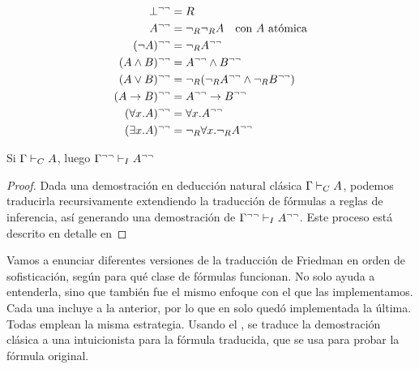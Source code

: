 \begin{definition}
    \begin{align*}
        \bot^{\neg\neg}                         & = R                                                             \\
        A^{\neg\neg}                        & = \neg_R\neg_R A
        \quad \text{con $A$ atómica}                                                                              \\
        (\neg A)^{\neg\neg}                & = \neg_R A^{\neg\neg}                                          \\
        (A \wedge B)^{\neg\neg}       & = A^{\neg\neg} \wedge B^{\neg\neg}                     \\
        (A \vee B)^{\neg\neg}        & = \neg_R(\neg_RA^{\neg\neg} \wedge \neg_RB^{\neg\neg}) \\
        (A \rightarrow B)^{\neg\neg} & = A^{\neg\neg} \rightarrow B^{\neg\neg}               \\
        (\forall x . A)^{\neg\neg}          & = \forall x . A^{\neg\neg}                                    \\
        (\exists x . A)^{\neg\neg}          & = \neg_R \forall x . \neg_R A^{\neg\neg}
    \end{align*}
\end{definition}

\begin{theorem}
    \label{fri:thm:dneg-trans-classic-int}
    Si $\Gamma \vdash_C A$, luego $\Gamma^{\neg\neg} \vdash_I A^{\neg\neg}$
\end{theorem}
\begin{proof}
    Dada una demostración en deducción natural clásica $\Gamma \vdash_C A$, podemos traducirla recursivamente extendiendo la traducción de fórmulas a reglas de inferencia, así generando una demostración de $\Gamma^{\neg\neg} \vdash_I A^{\neg\neg}$.
    Este proceso está descrito en detalle en 
\end{proof}

Vamos a enunciar diferentes versiones de la traducción de Friedman en orden de sofisticación, según para qué clase de fórmulas funcionan. No solo ayuda a entenderla, sino que también fue el mismo enfoque con el que las implementamos. Cada una incluye a la anterior, por lo que en \ppaTool{} solo quedó implementada la última. Todas emplean la misma estrategia. Usando el , se traduce la demostración clásica a una intuicionista para la fórmula traducida, que se usa para probar la fórmula original.


